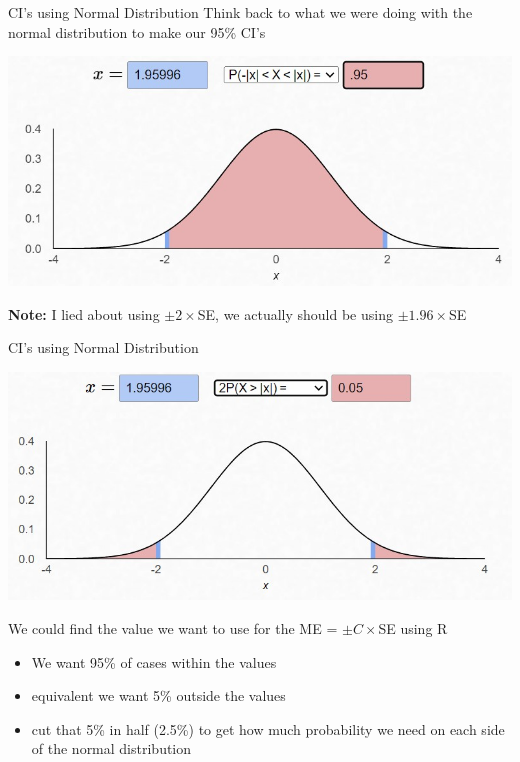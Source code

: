 \documentclass{beamer}
\begin{document}
\begin{frame}{CI's using Normal Distribution}
Think back to what we were doing with the normal distribution to make our 95\% CI's
\begin{center}
    \includegraphics[scale=.7]{img/normal_95ci.jpg}
\end{center}
\textbf{Note:} I lied about using $\pm 2 \times$SE, we actually should be using $\pm 1.96 \times$SE   
\end{frame}

\begin{frame}{CI's using Normal Distribution}
\begin{center}
    \includegraphics[scale=.6]{img/normal_95ci2.jpg}
\end{center}
\scriptsize
We could find the value we want to use for the ME = $\pm C \times$SE using R
\begin{itemize}
    \item We want 95\% of cases within the values
    \item equivalent we want 5\% outside the values
    \item cut that 5\% in half (2.5\%) to get how much probability we need on each side of the normal distribution
\end{itemize}
\end{frame}
\end{document}
